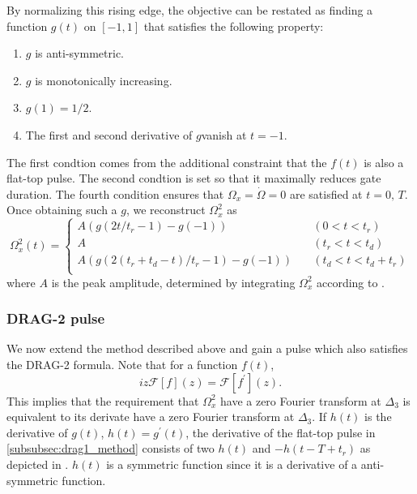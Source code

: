 By normalizing this rising edge, the objective can be restated as finding a function $g(t)$ on $[-1,1]$ that satisfies
the following property:
\begin{enumerate}
  \item \label{itm:g1} $g$ is anti-symmetric.
  \item \label{itm:g2} $g$ is monotonically increasing.
  \item \label{itm:g3} $g(1)=1/2$.
  \item  \label{itm:g4} The first and second derivative of $g$vanish at $t=-1$.
\end{enumerate}
The first condtion comes from the additional constraint that the $f(t)$ is also a flat-top pulse.
The second condtion is set so that it maximally reduces gate duration.
The fourth condition ensures that $\Omega_x=\dot{\Omega}=0$ are satisfied at $t=0,\,T$.
Once obtaining such a $g$, we reconstruct $\Omega_x^2$ as
\begin{equation}
  \Omega_x^2(t) =
  \begin{cases}
    A \left(g(2t/t_r-1)-g(-1)\right) \quad                     & (0<t<t_r)       \\
    A                         \quad                            & (t_r<t<t_d)     \\
    A\left( g(2(t_r+t_d-t)/t_r-1)-g(-1)\right)           \quad & (t_d<t<t_d+t_r) \\
  \end{cases}
  \label{eq:drag1_flattop}
\end{equation}
where $A$ is the peak amplitude, determined by integrating $\Omega_x^2$ according to .
\subsubsection{DRAG-2 pulse}
We now extend the method described above and gain a pulse which also satisfies the DRAG-2 formula.
Note that for a function $f(t)$,
$$iz\mathcal{F}[f](z) = \mathcal{F}[f^\prime](z).$$
This implies that the requirement that $\Omega_x^2$ have a zero Fourier transform at $\Delta_3$
is equivalent to its derivate have a zero Fourier transform at $\Delta_3$.
If $h(t)$ is the derivative of $g(t)$, $h(t)=g^\prime(t)$, the derivative of the flat-top pulse in \ref{subsubsec:drag1_method} consists of two
$h(t)$ and $-h(t-T+t_r)$ as depicted in .
$h(t)$ is a symmetric function since it is a derivative of a anti-symmetric function.

